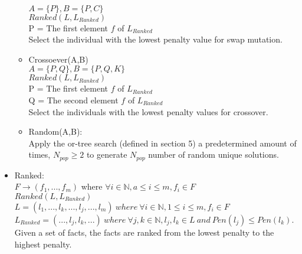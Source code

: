 \documentclass[12 pt]{article}        	%
\begin{document}
\begin{itemize}
\begin{itemize}
        \\ $ A= \{P\}, B = \{P, C\}$
        \\$Ranked(L, L_{Ranked})$
        \\ P = The first element $f$ of $L_{Ranked}$
        \\Select the individual with the lowest penalty value for swap mutation.
        \item Crossoever(A,B)
        \\ $ A= \{P, Q\}, B = \{P, Q, K\}$
        \\$Ranked(L, L_{Ranked})$
        \\ P = The first element $f$ of $L_{Ranked}$
        \\ Q = The second element $f$ of $L_{Ranked}$
        \\Select the individuals with the lowest penalty values for crossover.
        \item Random(A,B):
        \\ Apply the or-tree search (defined in section 5) a predetermined amount of times, $N_{pop} \ge 2$ to generate $N_{pop}$ number of random unique solutions.
    \end{itemize}


\item Ranked: 
\\ $F \to (f_1, ..., f_m)$ where $\forall i \in \mathbb{N}, a \le i \le m, f_i \in F$
\\ $Ranked(L, L_{Ranked})$
\\ $L = (l_1, ..., l_k, ..., l_j, ..., l_m) \: where \: \forall i \in \mathbb{N}, 1 \le i \le m, f_i \in F$
\\ $L_{Ranked} = (..., l_j, l_k, ...)\: where \: \forall j, k \in \mathbb{N}, l_j, l_k \in L \: and \:  Pen(l_j) \le Pen(l_k)$.
\\ Given a set of facts, the facts are ranked from the lowest penalty to the highest penalty.


\end{itemize}
\end{document}
